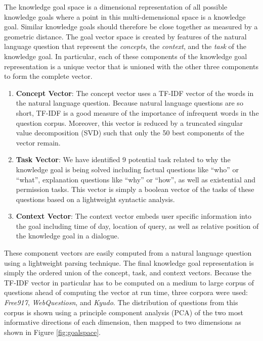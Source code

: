 \documentclass[letterpaper]{article}
\begin{document}
The knowledge goal space is a dimensional representation of all possible knowledge goals where a point in this multi-demensional space is a knowledge goal. Similar knowledge goals should therefore be close together as measured by a geometric distance. The goal vector space is created by features of the natural language question that represent the \textit{concepts}, the \textit{context}, and the \textit{task} of the knowledge goal. In particular, each of these components of the knowledge goal representation is a unique vector that is unioned with the other three components to form the complete vector.

\begin{enumerate}
    \item \textbf{Concept Vector}: The concept vector uses a TF-IDF vector of the words in the natural language question. Because natural language questions are so short, TF-IDF is a good measure of the importance of infrequent words in the question corpus. Moreover, this vector is reduced by a truncated singular value decomposition (SVD) such that only the 50 best components of the vector remain.
    \item \textbf{Task Vector}: We have identified 9 potential task related to why the knowledge goal is being solved including factual questions like ``who'' or ``what'', explanation questions like ``why'' or ``how'', as well as existential and permission tasks. This vector is simply a boolean vector of the tasks of these questions based on a lightweight syntactic analysis.
    \item \textbf{Context Vector}: The context vector embeds user specific information into the goal including time of day, location of query, as well as relative position of the knowledge goal in a dialogue.
\end{enumerate}

These component vectors are easily computed from a natural language question using a lightweight parsing technique. The final knowledge goal representation is simply the ordered union of the concept, task, and context vectors. Because the TF-IDF vector in particular has to be computed on a medium to large corpus of questions ahead of computing the vector at run time, three corpora were used: \textit{Free917}, \textit{WebQuestiosn}, and \textit{Kyudo}. The distribution of questions from this corpus is shown using a principle component analysis (PCA) of the two most informative directions of each dimension, then mapped to two dimensions as shown in Figure \ref{fig:goalspace}.
\end{document}
